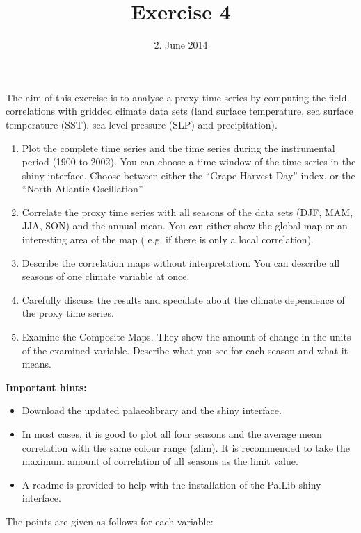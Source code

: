 \documentclass[a4paper,12pt]{article}
\title{Exercise 4}
\date{2. June 2014}
\begin{document}
\maketitle
\thispagestyle{fancy}

The aim of this exercise is to analyse a proxy time series by
computing the field correlations with gridded climate data sets (land
surface temperature, sea surface temperature (SST), sea level pressure
(SLP) and precipitation). 

\begin{enumerate}

\item Plot the complete time series and the time series during the
  instrumental period (1900 to 2002). You can choose a time window of
  the time series in the shiny interface. Choose between either the
  ``Grape Harvest Day'' index, or the ``North Atlantic Oscillation''
\\


\item Correlate the proxy time series with all seasons of the data sets (DJF, MAM, JJA, SON) and the annual mean. You can either show the global map or an interesting area of the map ( e.g. if there is only a local correlation).\\


\item Describe the correlation maps without interpretation. You can describe all seasons of one climate variable at once.  
\\
\item Carefully discuss the results and speculate about the climate dependence of the proxy time series.  
\\
\item Examine the Composite Maps. They show the amount of change in
  the units of the examined variable. Describe what you see for each season and what
  it means.

\end{enumerate}

\textbf{Important hints:}
\begin{itemize}
\item Download the updated palaeolibrary and the shiny interface.
\item  In most cases, it is good to plot all four seasons and the
  average mean correlation with the same colour range (zlim). It is
  recommended to take the maximum amount of correlation of all seasons
  as the limit value. 
\item A readme is provided to help with the installation of the PalLib
  shiny interface.

\end{itemize}
\newpage
The points are given as follows for each variable:
\end{document}
